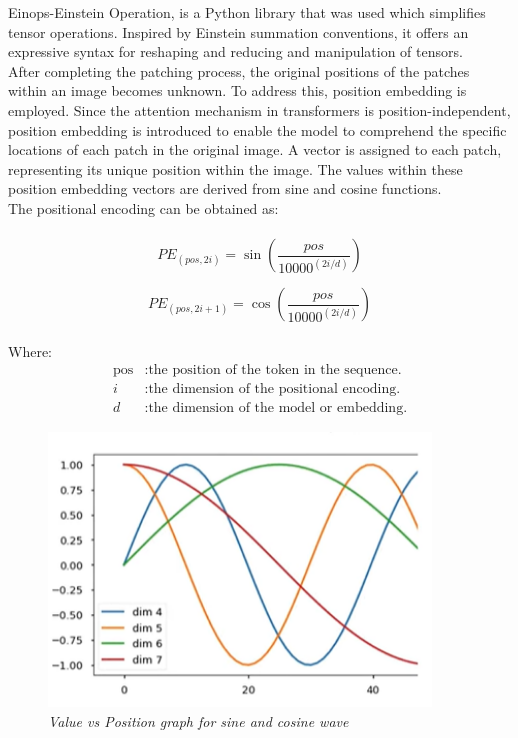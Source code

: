 Einops-Einstein Operation, is a Python library that was used which simplifies tensor operations. Inspired by Einstein summation conventions, it offers an expressive syntax for reshaping and reducing and manipulation of tensors. \\

After completing the patching process, the original positions of the patches within an image becomes unknown. To address this, position embedding is employed. Since the attention mechanism in transformers is position-independent, position embedding is introduced to enable the model to comprehend the specific locations of each patch in the original image. A vector is assigned to each patch, representing its unique position within the image. The values within these position embedding vectors are derived from sine and cosine functions.\\

The positional encoding can be obtained as:\\
\\
\[
    PE_{(pos, 2i)} = \sin\left(\frac{pos}{{10000}^{(2i/d)}}\right)
\]

\[
    PE_{(pos, 2i+1)} = \cos\left(\frac{pos}{{10000}^{(2i/d)}}\right)
\]
\\
Where:
\begin{align*}
    \text{pos} & : \text{the position of the token in the sequence.} \\
    i          & : \text{the dimension of the positional encoding.}  \\
    d          & : \text{the dimension of the model or embedding.}
\end{align*}

\begin{figure}[htbp]
    \centering
    \includegraphics[width=4in]{img/plot for sine and cosine wave.png}
    \caption{\textit{Value vs Position graph for sine and cosine wave}}
\end{figure}

